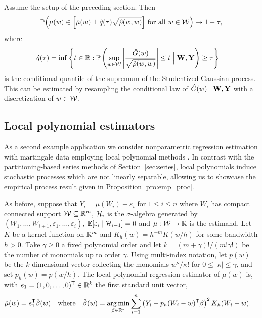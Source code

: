 \begin{proposition}%
  \label{pro:series_feasible}
  Assume the setup of the preceding section. Then
  \begin{align*}
    \mathbb{P}\Big(
    \mu(w) \in
    \Big[
        \hat\mu(w) \pm \hat q(\tau)
        \sqrt{\hat\rho(w,w)}
        \Big]
    \ \text{for all }
    w \in \mathcal{W} \Big)
    \to 1-\tau,
  \end{align*}
  where
  \vspace*{-2mm}
  \begin{align*}
    \hat{q}(\tau)
    &=
    \inf
    \left\{
    t \in \mathbb{R}:
    \mathbb{P}\left(
      \sup_{w \in \mathcal{W}}
      \left|
      \frac{\hat G(w)}{\sqrt{\hat\rho(w,w)}}
      \right|
      \leq t
      \Bigm| \mathbf{W}, \mathbf{Y}
    \right)
    \geq \tau
    \right\}
  \end{align*}
  is the conditional quantile of the supremum of the Studentized Gaussian
  process. This can be estimated by resampling the conditional law of
  $\hat G(w) \mid \mathbf{W}, \mathbf{Y}$ with a discretization of $w \in \mathcal{W}$.
\end{proposition}

\subsection{Local polynomial estimators}
\label{sec:local_poly}

As a second example application we consider nonparametric regression estimation
with martingale data employing local polynomial methods
\citep{Fan-Gijbels_1996_Book}. In contrast with the partitioning-based series
methods of Section~\ref{sec:series}, local polynomials induce stochastic
processes which are not linearly separable, allowing us to showcase the
empirical process result given in Proposition \ref{pro:emp_proc}.

As before, suppose that
$Y_i = \mu(W_i) + \varepsilon_i$
for $ 1 \leq i \leq n$
where $W_i$ has compact connected support $\mathcal{W} \subseteq \mathbb{R}^m$,
$\mathcal{H}_i$ is the $\sigma$-algebra generated by
$(W_1, \ldots, W_{i+1}, \varepsilon_1, \ldots, \varepsilon_i)$,
$\mathbb{E}[\varepsilon_i \mid \mathcal{H}_{i-1}] = 0$
and $\mu: \mathcal{W} \to \mathbb{R}$ is the estimand. Let $K$ be a kernel function on $\mathbb{R}^m$
and $K_h(w) = h^{-m} K(w/h)$
for some bandwidth $h > 0$.
Take $\gamma \geq 0$ a fixed polynomial order and let
$k = (m+\gamma)!/(m!\gamma!)$ be the number of monomials up to order $\gamma$.
Using multi-index notation,
let $p(w)$ be the $k$-dimensional vector
collecting the monomials $w^{\kappa}/\kappa!$
for $0 \leq |\kappa| \leq \gamma$,
and set $p_h(w) = p(w/h)$.
The local polynomial regression estimator of $\mu(w)$ is,
with $e_1 = (1, 0, \ldots, 0)^{\mathsf{T}} \in \mathbb{R}^k$ the first standard unit vector,
%
\begin{align*}
  \hat{\mu}(w)
  &=
  e_1^{\mathsf{T}}\hat{\beta}(w)
  &\text{where}      &
  &\hat{\beta}(w)
  &=
  \operatorname*{arg\,min}_{\beta \in \mathbb{R}^{k}}
  \sum_{i=1}^n
  \left(Y_i - p_h(W_i-w)^{\mathsf{T}} \beta \right)^2
  K_h(W_i-w).
\end{align*}

